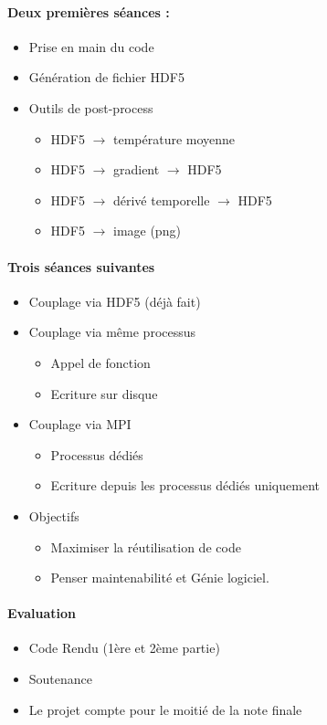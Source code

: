 \documentclass{article}
\begin{document}
\paragraph{Deux premières séances :}
\begin{itemize}
\item Prise en main du code
\item Génération de fichier HDF5
\item Outils de post-process
\begin{itemize}
\item HDF5 $\to$ température moyenne
\item HDF5 $\to$ gradient $\to$ HDF5
\item HDF5 $\to$ dérivé temporelle $\to$ HDF5
\item HDF5 $\to$ image (png)
\end{itemize}
\end{itemize}



\paragraph{Trois séances suivantes}
\begin{itemize}
\item Couplage via HDF5 (déjà fait)
\item Couplage via même processus
\begin{itemize}
\item Appel de fonction
\item Ecriture sur disque
\end{itemize}
\item Couplage via MPI
\begin{itemize}
\item Processus dédiés
\item Ecriture depuis les processus dédiés uniquement
\end{itemize}
\item Objectifs
\begin{itemize}
\item Maximiser la réutilisation de code
\item Penser maintenabilité et Génie logiciel.
\end{itemize}
\end{itemize}

\paragraph{Evaluation}
\begin{itemize}
\item Code Rendu (1ère et 2ème partie)
\item Soutenance
\item Le projet compte pour le moitié de la note finale
\end{itemize}
\end{document}
